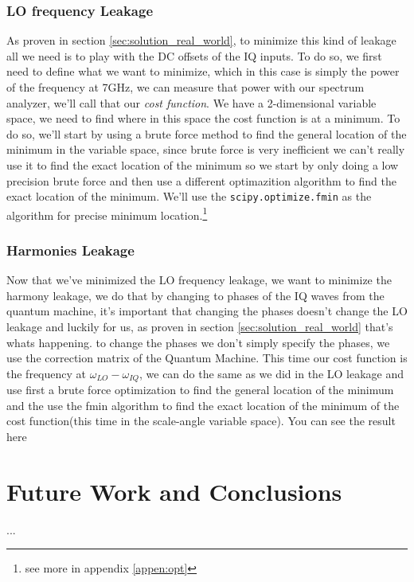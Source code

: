 \documentclass[english, a4paper, 12pt, twoside]{article}
\numberwithin{equation}{section} %
\begin{document}
\subsubsection{LO frequency Leakage}
As proven in section \ref{sec:solution_real_world}, to minimize this kind of leakage all we need is to play with the DC offsets of the IQ inputs. To do so, we first need to define what we want to minimize, which in this case is simply the power of the frequency at 7GHz, we can measure that power with our spectrum analyzer, we'll call that our \textit{cost function}.
We have a 2-dimensional variable space, we need to find where in this space the cost function is at a minimum. To do so, we'll start by using a brute force method to find the general location of the minimum in the variable space, since brute force is very inefficient we can't really use it to find the exact location of the minimum so we start by only doing a low precision brute force and then use a different optimazition algorithm to find the exact location of the minimum. We'll use the \texttt{scipy.optimize.fmin} as the algorithm for precise minimum location.\footnote{see more in appendix \ref{appen:opt}} %

\subsubsection{Harmonies Leakage}
Now that we've minimized the LO frequency leakage, we want to minimize the harmony leakage, we do that by changing to phases of the IQ waves from the quantum machine, it's important that changing the phases doesn't change the LO leakage and luckily for us, as proven in section \ref{sec:solution_real_world} that's whats happening. to change the phases we don't simply specify the phases, we use the correction matrix of the Quantum Machine. %
This time our cost function is the frequency at $\omega_{LO} - \omega_{IQ}$, we can do the same as we did in the LO leakage and use first a brute force optimization to find the general location of the minimum and the use the fmin algorithm to find the exact location of the minimum of the cost function(this time in the scale-angle variable space). You can see the result here

\newpage
\section{Future Work and Conclusions}
...
\end{document}

